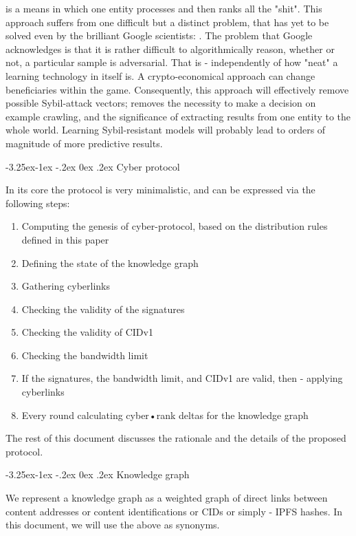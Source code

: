 \documentclass[8pt,oneside]{amsart}
\makeatletter
\newcommand{\linkgreen}[2]{\href{#1}{\color{green}{#2}}}
\renewcommand\subsection{\@startsection{subsection}{2}{\z@}%
                                     {-3.25ex\@plus -1ex \@minus -.2ex}%
                                     {0ex \@plus .2ex}%
                                     {\play\Large}}%
\newcommand{\titleSection}[1]{\subsection{#1}}
\makeatother
\begin{document}
\begin{Abstract}
\linkgreen{https://ipfs.io/ipfs/QmeS4LjoL1iMNRGuyYSx78RAtubTT2bioSGnsvoaupcHR6}{The current architecture of search engines} is a means in which one entity processes and then ranks all the "shit". This approach suffers from one difficult but a distinct problem, that has yet to be solved even by the brilliant Google scientists: \linkgreen{https://ipfs.io/ipfs/QmNrAFz34SLqkzhSg4wAYYJeokfJU5hBEpkT4hPRi226y9}{the adversarial example problem}. The problem that Google acknowledges is that it is rather difficult to algorithmically reason, whether or not, a particular sample is adversarial. That is - independently of how "neat" a learning technology in itself is. A crypto-economical approach can change beneficiaries within the game. Consequently, this approach will effectively remove possible Sybil-attack vectors; removes the necessity to make a decision on example crawling, and the significance of extracting results from one entity to the whole world. Learning Sybil-resistant models will probably lead to orders of magnitude of more predictive results.

\titleSection{Cyber protocol}\label{Cyber protocol}

In its core the protocol is very minimalistic, and can be expressed via the following steps:

\begin{enumerate}[nosep]
\item Computing the genesis of cyber-protocol, based on the distribution rules defined in this paper
\item Defining the state of the knowledge graph
\item Gathering cyberlinks
\item Checking the validity of the signatures
\item Checking the validity of CIDv1
\item Checking the bandwidth limit
\item If the signatures, the bandwidth limit, and CIDv1 are valid, then - applying cyberlinks
\item Every round calculating cyber•rank deltas for the knowledge graph
\end{enumerate}

The rest of this document discusses the rationale and the details of the proposed protocol.

\titleSection{Knowledge graph}\label{knowledge graph}

We represent a knowledge graph as a weighted graph of direct links between content addresses or content identifications or CIDs or simply - IPFS hashes. In this document, we will use the above as synonyms.


\end{Abstract}
\end{document}
